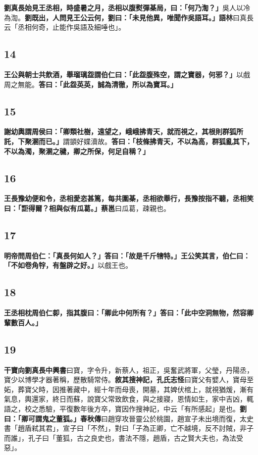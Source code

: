 \textbf{劉真長始見王丞相，時盛暑之月，丞相以腹熨彈棊局，曰：「何乃渹？」}{\footnotesize 吳人以冷為渹。}\textbf{劉既出，人問見王公云何，劉曰：「未見他異，唯聞作吳語耳。」}{\footnotesize \textbf{語林}曰真長云「丞相何奇，止能作吳語及細唾也」。}

\subsection*{14}

\textbf{王公與朝士共飲酒，舉瑠璃盌謂伯仁曰：「此盌腹殊空，謂之寶器，何邪？」}{\footnotesize 以戲周之無能。}\textbf{答曰：「此盌英英，誠為清徹，所以為寶耳。」}

\subsection*{15}

\textbf{謝幼輿謂周侯曰：「卿類社樹，遠望之，峨峨拂青天，就而視之，其根則群狐所託，下聚溷而已。」}{\footnotesize 謂顗好媟瀆故。}\textbf{答曰：「枝條拂青天，不以為高，群狐亂其下，不以為濁，聚溷之穢，卿之所保，何足自稱？」}

\subsection*{16}

\textbf{王長豫幼便和令，丞相愛恣甚篤，每共圍棊，丞相欲舉行，長豫按指不聽，丞相笑曰：「詎得爾？相與似有瓜葛。」}{\footnotesize \textbf{蔡邕}曰瓜葛，疎親也。}

\subsection*{17}

\textbf{明帝問周伯仁：「真長何如人？」答曰：「故是千斤犗特。」王公笑其言，伯仁曰：「不如卷角牸，有盤辟之好。」}{\footnotesize 以戲王也。}

\subsection*{18}

\textbf{王丞相枕周伯仁厀，指其腹曰：「卿此中何所有？」答曰：「此中空洞無物，然容卿輩數百人。」}

\subsection*{19}

\textbf{干寶向劉真長}{\footnotesize \textbf{中興書}曰寶，字令升，新蔡人，祖正，吳奮武將軍，父瑩，丹陽丞，寶少以博學才器著稱，歷散騎常侍。}\textbf{敘其搜神記，}{\footnotesize \textbf{孔氏志怪}曰寶父有嬖人，寶母至妬，葬寶父時，因推著藏中，經十年而母喪，開墓，其婢伏棺上，就視猶煖，漸有氣息，輿還家，終日而蘇，說寶父常致飲食，與之接寢，恩情如生，家中吉凶，輒語之，校之悉驗，平復數年後方卒，寶因作搜神記，中云「有所感起」是也。}\textbf{劉曰：「卿可謂鬼之董狐。」}{\footnotesize \textbf{春秋傳}曰趙穿攻晉靈公於桃園，趙宣子未出境而復，太史書「趙盾弒其君」，宣子曰「不然」，對曰「子為正卿，亡不越境，反不討賊，非子而誰」，孔子曰「董狐，古之良史也，書法不隱，趙盾，古之賢大夫也，為法受惡」。}

